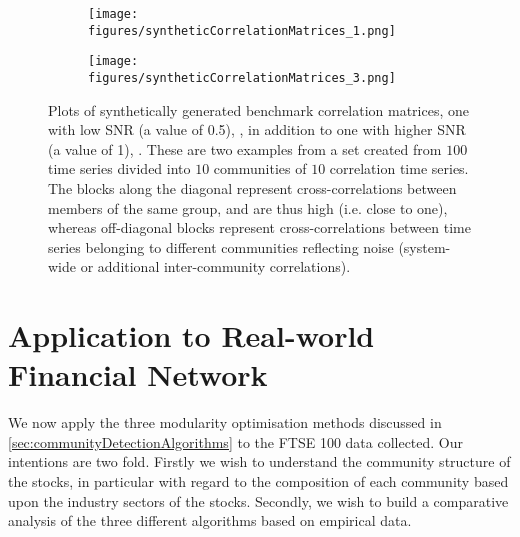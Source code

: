 \begin{figure}
	\centering
	\begin{subfigure}{.5\textwidth}
		\centering
		\texttt{[image: figures/syntheticCorrelationMatrices\_1.png]}
		\caption{}
		\label{fig:benchmarkCorrelationMatrix1}
	\end{subfigure}%
	\begin{subfigure}{.5\textwidth}
		\centering
		\texttt{[image: figures/syntheticCorrelationMatrices\_3.png]}
		\caption{}
		\label{fig:benchmarkCorrelationMatrix3}
	\end{subfigure}
	\caption[Plots of synthetically generated benchmark correlation matrices]{\label{fig:benchmarkCorrelationMatrices} Plots of synthetically generated benchmark correlation matrices, one with low SNR (a value of 0.5), , in addition to one with higher SNR (a value of 1), . These are two examples from a set created from $100$ time series divided into $10$ communities of $10$ correlation time series. The blocks along the diagonal represent cross-correlations between members of the same group, and are thus high (i.e. close to one), whereas off-diagonal blocks represent cross-correlations between time series belonging to different communities reflecting noise (system-wide or additional inter-community correlations).}
\end{figure}


\section{Application to Real-world Financial Network}
\label{sec:applicationToRealWorldFinancialNetwork}

We now apply the three modularity optimisation methods discussed in \cref{sec:communityDetectionAlgorithms} to the FTSE 100 data collected.
Our intentions are two fold.
Firstly we wish to understand the community structure of the stocks, in particular with regard to the composition of each community based upon the industry sectors of the stocks.
Secondly, we wish to build a comparative analysis of the three different algorithms based on empirical data.


